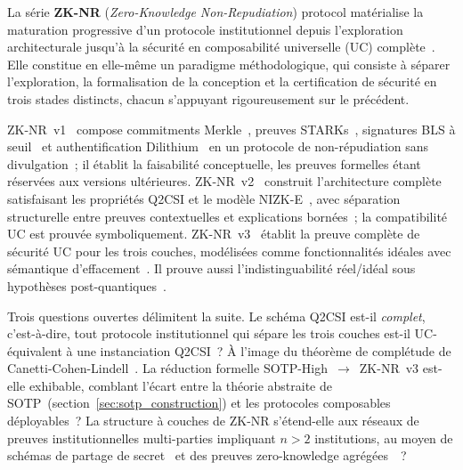 \begin{sloppypar}
La s\'erie \textbf{ZK-NR} (\textit{Zero-Knowledge Non-Repudiation}) protocol
mat\'erialise la maturation progressive d'un protocole institutionnel depuis
l'exploration architecturale jusqu'\`a la s\'ecurit\'e en composabilit\'e universelle (UC)
compl\`ete~\cite{Canetti01}. Elle constitue en elle-m\^eme un paradigme
m\'ethodologique, qui consiste \`a s\'eparer l'exploration, la formalisation de la conception et la
certification de s\'ecurit\'e en trois stades distincts, chacun s'appuyant
rigoureusement sur le pr\'ec\'edent.

ZK-NR~v1~\cite{MINKA2025ZKNR_Exploration} compose commitments
Merkle~\cite{Merkle1987}, preuves STARKs~\cite{STARKs18}, signatures BLS \`a
seuil~\cite{Boldyreva2003,Boneh2003} et authentification
Dilithium~\cite{Dilithium2022} en un protocole de non-r\'epudiation sans
divulgation~; il \'etablit la faisabilit\'e conceptuelle, les preuves formelles
\'etant r\'eserv\'ees aux versions ult\'erieures. ZK-NR~v2~\cite{MINKA2025ZKNR_Design}
construit l'architecture compl\`ete satisfaisant les propri\'et\'es Q2CSI et le
mod\`ele NIZK-E~\cite{Groth16}, avec s\'eparation structurelle entre preuves
contextuelles et explications born\'ees~; la compatibilit\'e UC est prouv\'ee
symboliquement. ZK-NR~v3~\cite{MINKA2025ZKNR_UC} \'etablit la preuve
compl\`ete de s\'ecurit\'e UC pour les trois couches, mod\'elis\'ees comme
fonctionnalit\'es id\'eales avec s\'emantique d'effacement~\cite{Canetti2016}.
Il prouve aussi l'indistinguabilit\'e r\'eel/id\'eal sous hypoth\`eses
post-quantiques~\cite{Unruh2015}.

Trois questions ouvertes d\'elimitent la suite. Le sch\'ema Q2CSI est-il
\emph{complet}, c'est-\`a-dire, tout protocole institutionnel qui s\'epare
les trois couches est-il UC-\'equivalent \`a une instanciation Q2CSI~? \`A l'image du th\'eor\`eme de compl\'etude de
Canetti-Cohen-Lindell~\cite{CCL15}. La r\'eduction formelle
SOTP-High~$\to$~ZK-NR~v3 est-elle exhibable, comblant l'\'ecart entre la
th\'eorie abstraite de SOTP~(section~\ref{sec:sotp_construction}) et les
protocoles composables d\'eployables~? La structure \`a couches de ZK-NR
s'\'etend-elle aux r\'eseaux de preuves institutionnelles multi-parties
impliquant $n > 2$ institutions, au moyen de sch\'emas de partage de
secret~\cite{Shamir1979,Blakley1979} et des preuves zero-knowledge
agr\'eg\'ees~\cite{Bunz19}~?
\end{sloppypar}

